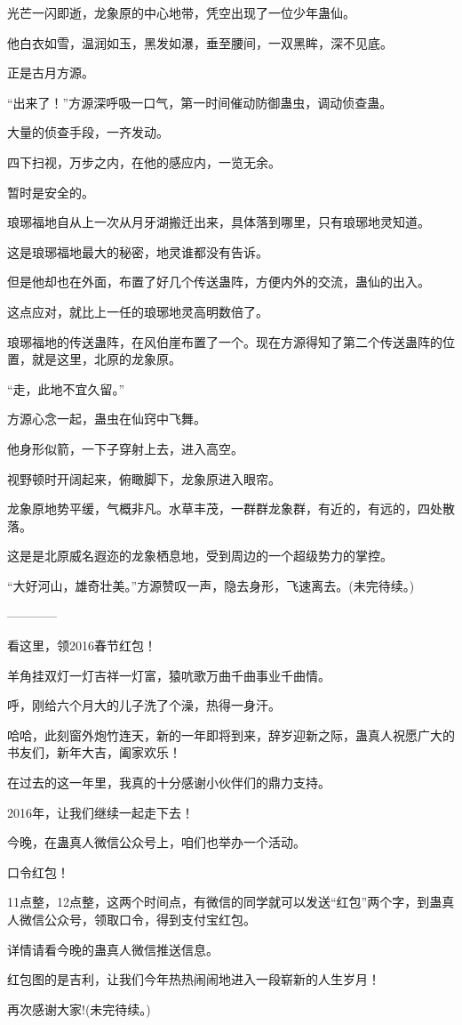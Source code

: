 \begin{this_body}
光芒一闪即逝，龙象原的中心地带，凭空出现了一位少年蛊仙。

他白衣如雪，温润如玉，黑发如瀑，垂至腰间，一双黑眸，深不见底。

正是古月方源。

“出来了！”方源深呼吸一口气，第一时间催动防御蛊虫，调动侦查蛊。

大量的侦查手段，一齐发动。

四下扫视，万步之内，在他的感应内，一览无余。

暂时是安全的。

琅琊福地自从上一次从月牙湖搬迁出来，具体落到哪里，只有琅琊地灵知道。

这是琅琊福地最大的秘密，地灵谁都没有告诉。

但是他却也在外面，布置了好几个传送蛊阵，方便内外的交流，蛊仙的出入。

这点应对，就比上一任的琅琊地灵高明数倍了。

琅琊福地的传送蛊阵，在风伯崖布置了一个。现在方源得知了第二个传送蛊阵的位置，就是这里，北原的龙象原。

“走，此地不宜久留。”

方源心念一起，蛊虫在仙窍中飞舞。

他身形似箭，一下子穿射上去，进入高空。

视野顿时开阔起来，俯瞰脚下，龙象原进入眼帘。

龙象原地势平缓，气概非凡。水草丰茂，一群群龙象群，有近的，有远的，四处散落。

这是是北原威名遐迩的龙象栖息地，受到周边的一个超级势力的掌控。

“大好河山，雄奇壮美。”方源赞叹一声，隐去身形，飞速离去。(未完待续。)

------------

看这里，领2016春节红包！

羊角挂双灯一灯吉祥一灯富，猿吭歌万曲千曲事业千曲情。

呼，刚给六个月大的儿子洗了个澡，热得一身汗。

哈哈，此刻窗外炮竹连天，新的一年即将到来，辞岁迎新之际，蛊真人祝愿广大的书友们，新年大吉，阖家欢乐！

在过去的这一年里，我真的十分感谢小伙伴们的鼎力支持。

2016年，让我们继续一起走下去！

今晚，在蛊真人微信公众号上，咱们也举办一个活动。

口令红包！

11点整，12点整，这两个时间点，有微信的同学就可以发送“红包”两个字，到蛊真人微信公众号，领取口令，得到支付宝红包。

详情请看今晚的蛊真人微信推送信息。

红包图的是吉利，让我们今年热热闹闹地进入一段崭新的人生岁月！

再次感谢大家!(未完待续。)

\end{this_body}

